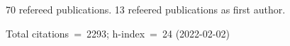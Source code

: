70 refereed publications. 13 refeered publications as first author.

Total citations~=~2293; h-index~=~24 (2022-02-02)